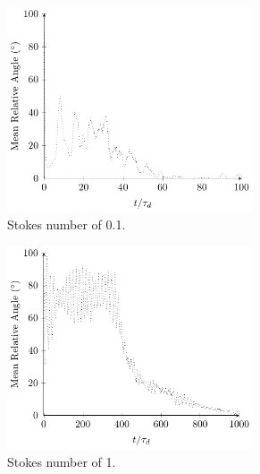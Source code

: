 \documentclass[../Interim_Report_Master]{subfiles}
\begin{document}
\begin{figure}[H]
	\centering
	\begin{subfigure}[t]{0.6\textwidth}
		\centering
		\includegraphics[width=0.8\textwidth]{./Diagrams/Statistical_Verification_Test/stk_0_1/Statistical_Verification_Test_Angle_stk_0_1_.pdf}
		\caption{Stokes number of 0.1.}
		\label{rel_ang_stk_0_1}
	\end{subfigure}
	\begin{subfigure}[t]{0.6\textwidth}
		\centering
		\includegraphics[width=0.8\textwidth]{./Diagrams/Statistical_Verification_Test/stk_1/Statistical_Verification_Test_Angle_stk_1.pdf}
		\caption{Stokes number of 1.}
		\label{rel_ang_stk_1}
	\end{subfigure}
	\begin{subfigure}[t]{0.6\textwidth}
		\centering

\end{subfigure}
\end{figure}
\end{document}
